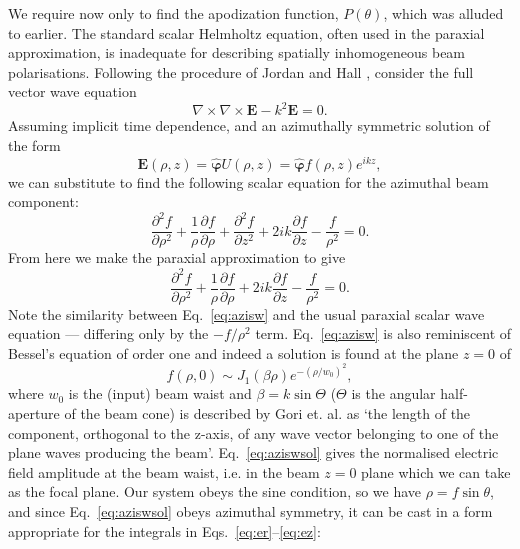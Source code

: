 \documentclass[12pt,a4paper]{article}
\begin{document}
We require now only to find the apodization function, \(P\!\left(\theta\right)\), which was alluded to earlier. The standard scalar Helmholtz equation, often used in the paraxial approximation, is inadequate for describing spatially inhomogeneous beam polarisations. Following the procedure of Jordan and Hall \cite{jordan_hall}, consider the full vector wave equation
\begin{displaymath}
	\nabla\times\nabla\times\mathbf{E} -k^{2}\mathbf{E} = 0.
\end{displaymath}
Assuming implicit time dependence, and an azimuthally symmetric solution of the form
\begin{displaymath}
	\mathbf{E}\!\left(\rho,z\right)=\hat{\boldsymbol{\varphi}}U\!\left(\rho,z\right)=\hat{\boldsymbol{\varphi}}f\!\left(\rho,z\right)e^{ikz},
\end{displaymath}
we can substitute to find the following scalar equation for the azimuthal beam component:
\begin{displaymath}
	\frac{\partial^{2}\!f}{\partial \rho^{2}}+	\frac{1}{\rho}\frac{\partial f}{\partial\rho}+\frac{\partial^{2}\!f}{\partial z^{2}}+2ik\frac{\partial f}{\partial z}-\frac{f}{\rho^{2}}=0.
\end{displaymath}
From here we make the paraxial approximation to give
\begin{equation}
	\label{eq:azisw}
	\frac{\partial^{2}\!f}{\partial \rho^{2}}+	\frac{1}{\rho}\frac{\partial f}{\partial \rho}+2ik\frac{\partial f}{\partial z}-\frac{f}{\rho^{2}}=0.
\end{equation}
Note the similarity between Eq.~\eqref{eq:azisw} and the usual paraxial scalar wave equation --- differing only by the \(-f/\rho^{2}\) term. Eq.~\eqref{eq:azisw} is also reminiscent of Bessel's equation of order one and indeed a solution is found at the plane \(z=0\) of
\begin{equation}
	\label{eq:aziswsol}
	f\!\left(\rho,0\right)\sim J_{1}\!\left(\beta \rho\right)e^{-(\rho/w_{0})^{2}},
\end{equation}
where \(w_{0}\) is the (input) beam waist and \(\beta=k\sin{\Theta}\) (\(\Theta\) is the angular half-aperture of the beam cone) is described by Gori et. al. \cite{gori} as `the length of the component, orthogonal to the z-axis, of any wave vector belonging to one of the plane waves producing the beam'. Eq.~\eqref{eq:aziswsol} gives the normalised electric field amplitude at the beam waist, i.e. in the beam \(z=0\) plane which we can take as the focal plane. Our system obeys the sine condition, so we have \(\rho=f\sin{\theta}\), and since Eq.~\eqref{eq:aziswsol} obeys azimuthal symmetry, it can be cast in a form appropriate for the integrals in Eqs.~\eqref{eq:er}--\eqref{eq:ez}:
\end{document}
